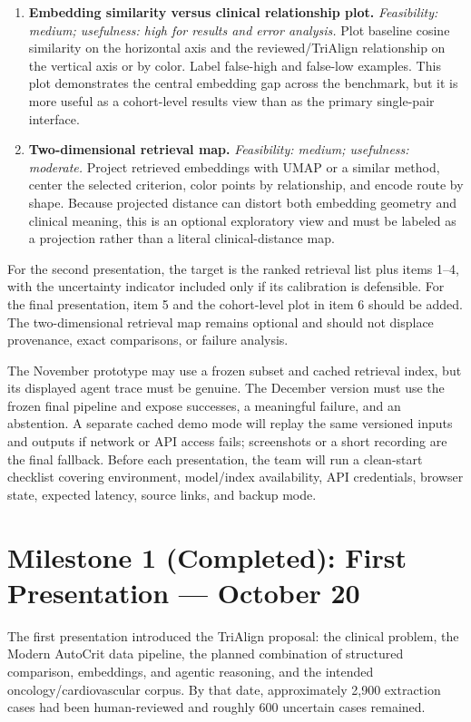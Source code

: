 \documentclass[10pt]{article}
\begin{document}
\begin{enumerate}
\item \textbf{Embedding similarity versus clinical relationship plot.} \emph{Feasibility: medium; usefulness: high for results and error analysis.} Plot baseline cosine similarity on the horizontal axis and the reviewed/TriAlign relationship on the vertical axis or by color. Label false-high and false-low examples. This plot demonstrates the central embedding gap across the benchmark, but it is more useful as a cohort-level results view than as the primary single-pair interface.

\item \textbf{Two-dimensional retrieval map.} \emph{Feasibility: medium; usefulness: moderate.} Project retrieved embeddings with UMAP or a similar method, center the selected criterion, color points by relationship, and encode route by shape. Because projected distance can distort both embedding geometry and clinical meaning, this is an optional exploratory view and must be labeled as a projection rather than a literal clinical-distance map.
\end{enumerate}

For the second presentation, the target is the ranked retrieval list plus items 1--4, with the uncertainty indicator included only if its calibration is defensible. For the final presentation, item 5 and the cohort-level plot in item 6 should be added. The two-dimensional retrieval map remains optional and should not displace provenance, exact comparisons, or failure analysis.

The November prototype may use a frozen subset and cached retrieval index, but its displayed agent trace must be genuine. The December version must use the frozen final pipeline and expose successes, a meaningful failure, and an abstention. A separate cached demo mode will replay the same versioned inputs and outputs if network or API access fails; screenshots or a short recording are the final fallback. Before each presentation, the team will run a clean-start checklist covering environment, model/index availability, API credentials, browser state, expected latency, source links, and backup mode.

\section{Milestone 1 (Completed): First Presentation --- October 20}
The first presentation introduced the TriAlign proposal: the clinical problem, the Modern AutoCrit data pipeline, the planned combination of structured comparison, embeddings, and agentic reasoning, and the intended oncology/cardiovascular corpus. By that date, approximately 2,900 extraction cases had been human-reviewed and roughly 600 uncertain cases remained.
\end{document}
